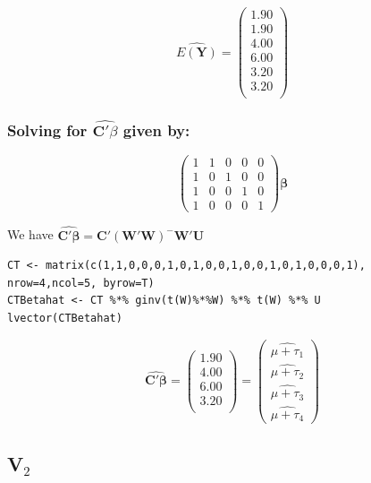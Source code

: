 \documentclass[11pt]{article}
\begin{document}
\[
\hat{E(\mathbf{Y})} =
\begin{pmatrix}{}
  1.90 \\ 
  1.90 \\ 
  4.00 \\ 
  6.00 \\ 
  3.20 \\ 
  3.20 \\ 
  \end{pmatrix}
\]
\subsubsection{Solving for $\widehat{\mathbf{C}'\beta}$ given by:}
\label{sec-2-1-2}


\[
\begin{pmatrix}
1 & 1 & 0 & 0 & 0 \\
1 & 0 & 1 & 0 & 0 \\
1 & 0 & 0 & 1 & 0 \\
1 & 0 & 0 & 0 & 1 
\end{pmatrix}\mathbf{\beta}
\]

We have $\widehat{\mathbf{C'\beta}} = \mathbf{C}'(\mathbf{W}'\mathbf{W})^{-}\mathbf{W}'\mathbf{U}$


\begin{verbatim}
CT <- matrix(c(1,1,0,0,0,1,0,1,0,0,1,0,0,1,0,1,0,0,0,1), nrow=4,ncol=5, byrow=T)
CTBetahat <- CT %*% ginv(t(W)%*%W) %*% t(W) %*% U
lvector(CTBetahat)
\end{verbatim}

\[
\widehat{\mathbf{C}'\mathbf{\beta}} =
\begin{pmatrix}{}
  1.90 \\ 
  4.00 \\ 
  6.00 \\ 
  3.20 \\ 
  \end{pmatrix} =
\begin{pmatrix}
\widehat{\mu + \tau_1} \\
\widehat{\mu + \tau_2} \\
\widehat{\mu + \tau_3} \\
\widehat{\mu + \tau_4}
\end{pmatrix}
\]
\subsection{V$_2$}
\label{sec-2-2}
\end{document}
